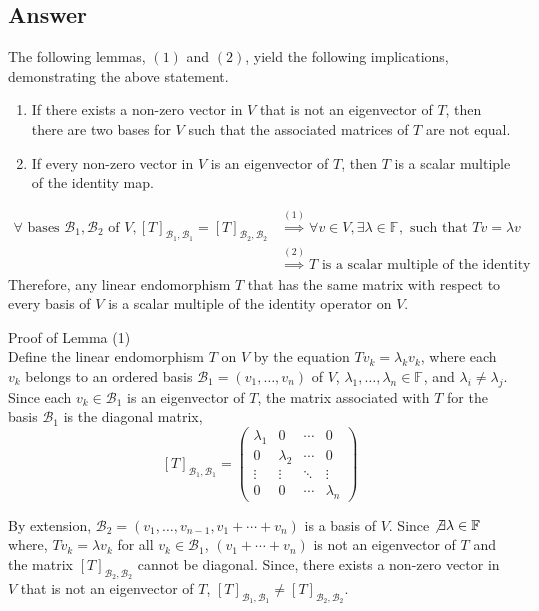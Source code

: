 \documentclass[
	12pt, %
]{fphw}
\newcommand\0{\mathbf{0}}
\newcommand\qed{\text{$\blacksquare$}}
\newcommand\F[1]{\text{$\mathbb{F}^{#1}$}}
\newcommand\B[1]{\text{$\mathcal{B}_{#1}$}}
\newcommand\ls[2]{\text{$#1_1, \ldots, #1_{#2}$}}
\begin{document}
\subsection*{Answer}
The following lemmas, $(1)$ and $(2)$, yield the following implications, demonstrating the above statement.
\begin{enumerate}
\item If there exists a non-zero vector in $V$ that is not an eigenvector of $T$, then there are two bases for $V$ such that the associated matrices of $T$ are not equal.
\item If every non-zero vector in $V$ is an eigenvector of $T$, then $T$ is a scalar multiple of the identity map.
\end{enumerate}
\begin{align*}
 \forall \text{ bases $\B1, \B2$ of } V, [T]_{\B1,\B1} = [T]_{\B2,\B2} &\overset{(1)}{\implies}  \forall v \in V, \exists \lambda \in \F{}, \text{ such that } Tv = \lambda v\\
&\overset{(2)}{\implies}\text{$T$ is a scalar multiple of the identity map.}
\end{align*}
Therefore, any linear endomorphism $T$ that has the same matrix with respect to every basis of $V$ is a scalar multiple of the identity operator on $V$.
\qed

\vspace{10 pt}
Proof of Lemma (1)\\
Define the linear endomorphism $T$ on $V$ by the equation $Tv_k = \lambda_kv_k$, where each $v_k$ belongs to an ordered basis $\B1=(\ls vn)$ of $V$, $\ls \lambda n \in \F{}$, and $\lambda_i \ne \lambda_j$. Since each $v_k \in \B1$ is an eigenvector of $T$, the matrix associated with $T$ for the basis $\B1$ is the diagonal matrix,
$$
[T]_{\B1, \B1}=
\begin{pmatrix}
\lambda_1 & 0 & \cdots & 0\\
0 & \lambda_2 & \cdots & 0\\
\vdots & \vdots & \ddots & \vdots \\
0 & 0 & \cdots & \lambda_n
\end{pmatrix}
$$

By extension, $\B2 = (v_1, \ldots, v_{n-1}, v_1 + \cdots +v_n)$ is a basis of $V$. Since $\not \exists \lambda \in \F{}$ where, $T v_k = \lambda v_k$ for all $v_k \in \B1$, $(v_1 + \cdots + v_n)$ is not an eigenvector of $T$ and the matrix $[T]_{\B2,\B2}$ cannot be diagonal. Since, there exists a non-zero vector in $V$ that is not an eigenvector of $T$, $[T]_{\B1,\B1} \ne [T]_{\B2,\B2}$.
\end{document}
